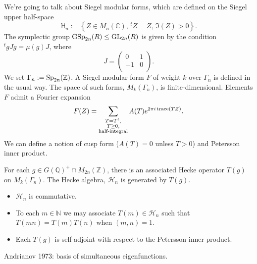\documentclass[reqno]{amsart} 
\begin{document}
We're going to talk about Siegel modular forms, which are defined on the Siegel upper half-space
\begin{equation*}
  \mathbb{H}_n := \left\{ Z \in M_n(\mathbb{C}), \, {}^t Z = Z, \, \Im(Z) > 0  \right\}.
\end{equation*}
The symplectic group $\operatorname{GSp}_{2 n}(R) \leq \operatorname{GL}_{2 n}(R)$ is given by the condition ${}^t g J g = \mu(g) J$, where
\begin{equation*}
  J =
  \begin{pmatrix}
    0  & 1 \\
    -1 & 0 \\
  \end{pmatrix}.
\end{equation*}
We set $\Gamma_n := \operatorname{Sp}_{2n}(\mathbb{Z})$.  A Siegel modular form $F$ of weight $k$ over $\Gamma_n$ is defined in the usual way.  The space of such forms, $M_k(\Gamma_n)$, is finite-dimensional.  Elements $F$ admit a Fourier expansion
\begin{equation*}
  F(Z) = \sum_{
    \substack{
      T = T^t,  \\
      T \geq 0, \\
      \text{half-integral}
    }
  }
  A(T) e^{2 \pi i \operatorname{trace}(T Z)}.
\end{equation*}
We can define a notion of cusp form ($A(T) = 0$ unless $T >0$) and Petersson inner product.

For each $g \in G(\mathbb{Q})^+ \cap M_{2 n}(\mathbb{Z})$, there is an associated Hecke operator $T(g)$ on $M_k(\Gamma_n)$.  The Hecke algebra, $\mathcal{H}_n$ is generated by $T(g)$.
\begin{itemize}
\item $\mathcal{H}_n$ is commutative.
\item To each $m \in \mathbb{N}$ we may associate $T(m) \in \mathcal{H}_n$ such that $T(m n) = T(m) T(n)$ when $(m, n) = 1$.
\item Each $T(g)$ is self-adjoint with respect to the Petersson inner product.
\end{itemize}
Andrianov 1973: basis of simultaneous eigenfunctions.
\end{document}
